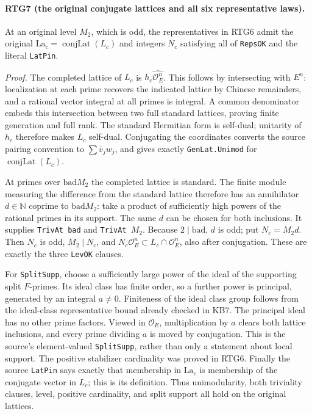 \paragraph{RTG7 (the original conjugate lattices and all six representative laws).}
\label{claim:RTG7}
At an original level $M_2$, which is odd, the representatives in RTG6
admit the original
$\mathrm{La}_c=\operatorname{conjLat}(L_c)$ and integers $N_c$
satisfying all of \texttt{RepsOK} and the literal \texttt{LatPin}.

\emph{Proof.}
The completed lattice of $L_c$ is $h_c\widehat{\mathcal O_E^n}$.
This follows by intersecting with $E^n$: localization at each prime
recovers the indicated lattice by Chinese remainders, and a rational
vector integral at all primes is integral.  A common denominator embeds
this intersection between two full standard lattices, proving finite
generation and full rank.  The standard Hermitian form is self-dual;
unitarity of $h_c$ therefore makes $L_c$ self-dual.  Conjugating the
coordinates converts the source pairing convention to
$\sum\bar v_jw_j$, and gives exactly \texttt{GenLat.Unimod} for
$\operatorname{conjLat}(L_c)$.

At primes over $\mathrm{bad}M_2$ the completed lattice is standard.
The finite module measuring the difference from the standard lattice
therefore has an annihilator $d\in\mathbb N$ coprime to
$\mathrm{bad}M_2$: take a product of sufficiently high powers of the
rational primes in its support.  The same $d$ can be chosen for both
inclusions.  It supplies \texttt{TrivAt bad} and \texttt{TrivAt $M_2$}.
Because $2\mid\mathrm{bad}$, $d$ is odd; put $N_c=M_2d$.
Then $N_c$ is odd, $M_2\mid N_c$, and
\(N_c\mathcal O_E^n\subset L_c\cap\mathcal O_E^n\), also after
conjugation.  These are exactly the three \texttt{LevOK} clauses.

For \texttt{SplitSupp}, choose a sufficiently large power of the ideal
of the supporting split $F$-primes.  Its ideal class has finite order,
so a further power is principal, generated by an integral $a\ne0$.
Finiteness of the ideal class group follows from the ideal-class
representative bound already checked in KB7.  The principal ideal has
no other prime factors.  Viewed in $\mathcal O_E$, multiplication by
$a$ clears both lattice inclusions, and every prime dividing $a$ is
moved by conjugation.  This is the source's element-valued
\texttt{SplitSupp}, rather than only a statement about local support.
The positive stabilizer cardinality was proved in RTG6.  Finally the
source \texttt{LatPin} says exactly that membership in $\mathrm{La}_c$
is membership of the conjugate vector in $L_c$; this is its definition.
Thus unimodularity, both triviality clauses, level, positive cardinality,
and split support all hold on the original lattices.

